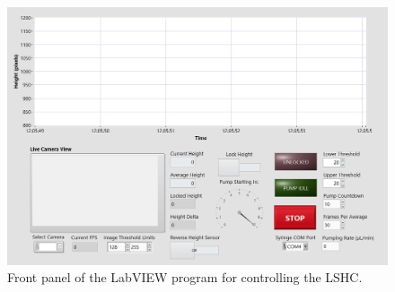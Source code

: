 \documentclass[11pt,a4paper,twoside]{article}
\begin{document}
\begin{figure}
\centering
\includegraphics[width=\textwidth]{frontpanel_manual}
\caption{Front panel of the LabVIEW program for controlling the LSHC.}\label{fig:frontpanel}
\end{figure}
\end{document}

